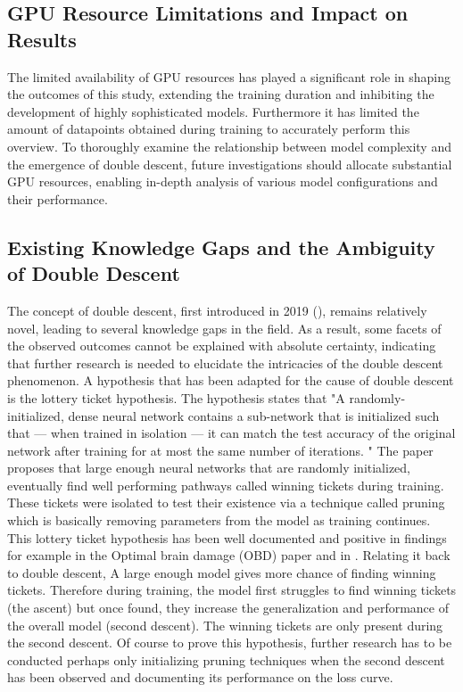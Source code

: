 \subsection{GPU Resource Limitations and Impact on Results}
The limited availability of GPU resources has played a significant role in shaping the outcomes of this study, extending the training duration and inhibiting the development of highly sophisticated models. Furthermore it has limited the amount of datapoints obtained during training to accurately perform this overview. To thoroughly examine the relationship between model complexity and the emergence of double descent, future investigations should allocate substantial GPU resources, enabling in-depth analysis of various model configurations and their performance.

\subsection{Existing Knowledge Gaps and the Ambiguity of Double Descent}
The concept of double descent, first introduced in 2019 (\cite{Belkin2019ReconcilingTrade-off}), remains relatively novel, leading to several knowledge gaps in the field. As a result, some facets of the observed outcomes cannot be explained with absolute certainty, indicating that further research is needed to elucidate the intricacies of the double descent phenomenon. A hypothesis that has been adapted for the cause of double descent is the lottery ticket hypothesis. The hypothesis states that "A randomly-initialized, dense neural network contains a sub-network that is initialized such that — when trained in isolation — it can match the test accuracy of the original network after training for at most the same number of iterations. \cite{Frankle2018TheNetworks}" The paper proposes that large enough neural networks that are randomly initialized, eventually find well performing pathways called winning tickets during training. These tickets were isolated to test their existence via a technique called pruning which is basically removing parameters from the model as training continues. This lottery ticket hypothesis has been well documented and positive in findings for example in the Optimal brain damage (OBD) paper \cite{Denker2014OptimalDamage} and in \cite{Frankle2018TheNetworks}. Relating it back to double descent, A large enough model gives more chance of finding winning tickets. Therefore during training, the model first struggles to find winning tickets (the ascent) but once found, they increase the generalization and performance of the overall model (second descent). The winning tickets are only present during the second descent. Of course to prove this hypothesis, further research has to be conducted perhaps only initializing pruning techniques when the second descent has been observed and documenting its performance on the loss curve.

